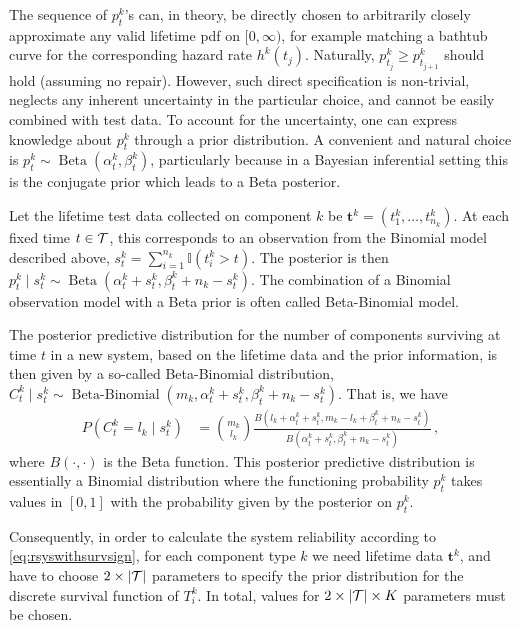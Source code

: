 \documentclass[12pt, a4paper]{elsarticle}
\newcommand{\bs}[1]{\boldsymbol{#1}}
\renewcommand{\vec}[1]{{\bs#1}}
\newcommand{\indic}{\mathbb{I}}
\newcommand{\be}{\operatorname{Beta}}
\newcommand{\bebin}{\operatorname{Beta-Binomial}}
\newcommand{\ptk}{p^k_t}
\begin{document}
The sequence of $\ptk$'s can, in theory, be directly chosen to arbitrarily closely approximate any valid lifetime pdf on
$[0,\infty)$, for example matching a bathtub curve for the corresponding hazard rate $h^k(t_j)$.
Naturally, $p^k_{t_j} \ge p^k_{t_{j+1}}$ should hold (assuming no repair).
However, such direct specification is non-trivial, neglects any inherent uncertainty in the particular choice, and cannot be 
easily combined with test data.
To account for the uncertainty, one can express knowledge about $\ptk$ through a prior distribution.
A convenient and natural choice is $\ptk \sim \be(\alpha^k_t, \beta^k_t)$, particularly because in a Bayesian inferential
setting this is the conjugate prior which leads to a Beta posterior.

Let the lifetime test data collected on component $k$ be $\vec{t}^k = (t^k_1, \ldots, t^k_{n_k})$.
At each fixed time $t \in {\cal T}$, this corresponds to an observation from the Binomial model described above,
$s^k_t = \sum_{i=1}^{n_k} \indic(t^k_i > t)$.
The posterior is then $\ptk \mid s^k_t \sim \be(\alpha^k_t + s^k_t, \beta^k_t + n_k - s^k_t)$.
The combination of a Binomial observation model with a Beta prior is often called Beta-Binomial model.

The posterior predictive distribution for the number of components surviving at time $t$
in a new system, based on the lifetime data and the prior information,
is then given by a so-called Beta-Binomial distribution,
$C^k_t \mid s^k_t \sim \bebin(m_k, \alpha^k_t + s^k_t, \beta^k_t + n_k - s^k_t)$.
That is, we have
\begin{align*}
P(C^k_t = l_k \mid s^k_t) &= {m_k \choose l_k} \frac{B(l_k + \alpha^k_t + s^k_t, m_k - l_k + \beta^k_t + n_k - s^k_t)}
                                                    {B(\alpha^k_t + s^k_t, \beta^k_t + n_k - s^k_t)} \,,
\end{align*}
where $B(\cdot, \cdot)$ is the Beta function.
This posterior predictive distribution is essentially a Binomial distribution
where the functioning probability $\ptk$ takes values in $[0,1]$
with the probability given by the posterior on $\ptk$.

Consequently, in order to calculate the system reliability according to \eqref{eq:rsyswithsurvsign},
for each component type $k$
we need lifetime data $\vec{t}^k$,
and have to choose $2 \times |{\cal T}|$ parameters
to specify the prior distribution for the discrete survival function of $T^k_i$.
In total, values for $2 \times |{\cal T}| \times K$ parameters must be chosen.
\end{document}

